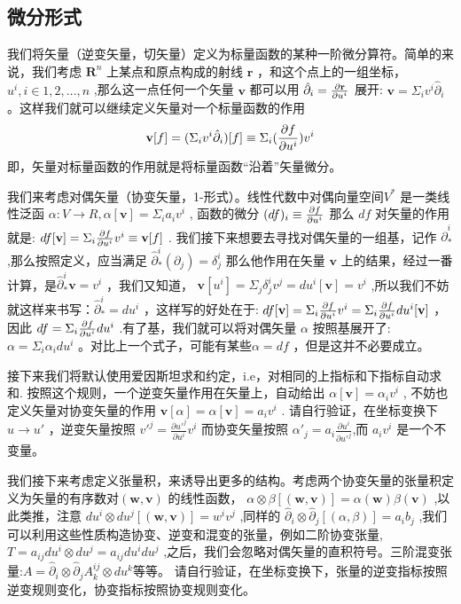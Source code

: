 \documentclass[supercite]{HustGraduPaper}
\begin{document}
	\begin{appendices}
		\section{微分形式\label{appendix: Differential}}
		我们将矢量（逆变矢量，切矢量）定义为标量函数的某种一阶微分算符。简单的来说，我们考虑 $\mathbf{R}^n$ 上某点和原点构成的射线 $\mathbf{r}$ ，和这个点上的一组坐标， $u^i,i \in {1,2,...,n}$ ,那么这一点任何一个矢量 $\mathbf{v}$ 都可以用 $\hat{\partial}_i = {\partial \mathbf{r} \over {\partial u^i}}$ 展开: $\mathbf{v} = \Sigma_i v^i \hat \partial_i$。这样我们就可以继续定义矢量对一个标量函数的作用
		\begin{equation}
		 \mathbf{v} [f] = (\Sigma_i v^i\hat \partial_i )[f] \equiv \Sigma_i ({\partial f \over {\partial u^i}})v^i
		\end{equation}
	即，矢量对标量函数的作用就是将标量函数“沿着”矢量微分。
		
		我们来考虑对偶矢量（协变矢量，1-形式）。线性代数中对偶向量空间$ V^*$ 是一类线性泛函 $\alpha: V \to R, \alpha[\mathbf{v}]=  \Sigma_i a_i v^i$ , 函数的微分 $(df)_i \equiv {\partial f \over{\partial u^i}}$ 那么 $df$ 对矢量的作用就是: $df[\mathbf{v}] = \Sigma_i{\partial f \over{\partial u^i}} v^i  \equiv \mathbf{v}[f]$ . 我们接下来想要去寻找对偶矢量的一组基，记作 $\hat \partial^i_*$ ,那么按照定义，应当满足 $\hat \partial^i_*(\partial_j) = \delta_j^i$ 那么他作用在矢量 $\mathbf{v}$ 上的结果，经过一番计算，是$\hat \partial^i_* \mathbf{v} = v^i$ ，我们又知道， $\mathbf{v}[u^i] = \Sigma_j \delta_j^i v^j=du^i[\mathbf{v}]=v^i$ ,所以我们不妨就这样来书写：$ \hat \partial^i_* = du^i$ ，这样写的好处在于: $df[\mathbf{v}] = \Sigma_i{\partial f\over{\partial u^i}} v^i=\Sigma_i{\partial f\over{\partial u^i}} du^i[\mathbf{v}]$ ，因此 $df =\Sigma_i{\partial f\over{\partial u^i}} du^i$ .有了基，我们就可以将对偶矢量 $\alpha$ 按照基展开了: $\alpha = \Sigma_i \alpha_i du^i$ 。对比上一个式子，可能有某些$ \alpha = df$ ，但是这并不必要成立。
		
		接下来我们将默认使用爱因斯坦求和约定，i.e，对相同的上指标和下指标自动求和. 按照这个规则，一个逆变矢量作用在矢量上，自动给出 $\alpha[\mathbf{v}] = \alpha_i v^i$ , 不妨也定义矢量对协变矢量的作用 $\mathbf{v}[\alpha] = \alpha[\mathbf{v}] = a_i v^i$ .
		请自行验证，在坐标变换下 $u \to u'$ ，逆变矢量按照 $v'^j = \frac{\partial u'^j}{\partial u^i} v^i$ 而协变矢量按照 $\alpha'_j = a_i \frac{\partial u^i}{\partial u'^j}$,而 $a_i v^i$ 是一个不变量。
		
		我们接下来考虑定义张量积，来诱导出更多的结构。考虑两个协变矢量的张量积定义为矢量的有序数对$ (\mathbf{w},\mathbf{v})$ 的线性函数， $\alpha \otimes \beta [(\mathbf{w},\mathbf{v})] = \alpha(\mathbf{w}) \beta(\mathbf{v})$ ,以此类推，注意 $du^i \otimes du^j [(\mathbf{w},\mathbf{v})] = w^i v^j$ ,同样的 $\hat \partial_i \otimes \hat \partial_j [(\alpha, \beta)] = a_i b_j$ ,我们可以利用这些性质构造协变、逆变和混变的张量，例如二阶协变张量, $T = a_{ij} du^i \otimes du^j = a_{ij} du^idu^j$ ,之后，我们会忽略对偶矢量的直积符号。三阶混变张量:$ A = \hat \partial_i \otimes \hat \partial_j A^{ij}_k \otimes du^k $等等。
		请自行验证，在坐标变换下，张量的逆变指标按照逆变规则变化，协变指标按照协变规则变化。
		

\end{appendices}
\end{document}
